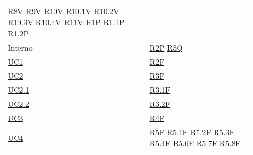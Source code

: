 \begin{center}
\begin{longtable}[!h]{m{50px} m{50px}}
        \newline \hyperref[tab:RequisitiVincolo]{R8V}
        \newline \hyperref[tab:RequisitiVincolo]{R9V}
        \newline \hyperref[tab:RequisitiVincolo]{R10V}
        \newline \hyperref[tab:RequisitiVincolo]{R10.1V}
        \newline \hyperref[tab:RequisitiVincolo]{R10.2V}
        \newline \hyperref[tab:RequisitiVincolo]{R10.3V}
        \newline \hyperref[tab:RequisitiVincolo]{R10.4V}
        \newline \hyperref[tab:RequisitiVincolo]{R11V}
        \newline \hyperref[tab:RequisitiPrestazionali]{R1P}
        \newline \hyperref[tab:RequisitiPrestazionali]{R1.1P}
        \newline \hyperref[tab:RequisitiPrestazionali]{R1.2P}                          \\

        Interno                           & \hyperref[tab:RequisitiPrestazionali]{R2P}
        \newline \hyperref[tab:RequisitiQualita]{R5Q}                                  \\

        \hyperref[sec:UC1]{UC1}           & \hyperref[tab:RequisitiFunzionali]{R2F}    \\
        \hyperref[sec:UC2]{UC2}           & \hyperref[tab:RequisitiFunzionali]{R3F}    \\
        \hyperref[sec:UC2.1]{UC2.1}       & \hyperref[tab:RequisitiFunzionali]{R3.1F}  \\
        \hyperref[sec:UC2.2]{UC2.2}       & \hyperref[tab:RequisitiFunzionali]{R3.2F}  \\
        \hyperref[sec:UC3]{UC3}           & \hyperref[tab:RequisitiFunzionali]{R4F}    \\

        \hyperref[sec:UC4]{UC4}           & \hyperref[tab:RequisitiFunzionali]{R5F}
        \newline \hyperref[tab:RequisitiFunzionali]{R5.1F}
        \newline \hyperref[tab:RequisitiFunzionali]{R5.2F}
        \newline \hyperref[tab:RequisitiFunzionali]{R5.3F}
        \newline \hyperref[tab:RequisitiFunzionali]{R5.4F}
        \newline \hyperref[tab:RequisitiFunzionali]{R5.6F}
        \newline \hyperref[tab:RequisitiFunzionali]{R5.7F}
        \newline \hyperref[tab:RequisitiFunzionali]{R5.8F}                             \\


\end{longtable}
\end{center}
